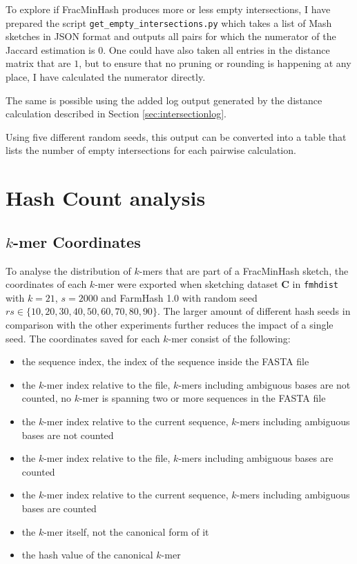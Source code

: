 To explore if FracMinHash produces more or less empty intersections, I have
prepared the script \texttt{get\_empty\_intersections.py} which takes a list of
Mash sketches in JSON format and outputs all pairs for which the numerator of
the Jaccard estimation is $0$. One could have also taken all entries in the
distance matrix that are $1$, but to ensure that no pruning or rounding is
happening at any place, I have calculated the numerator directly.

The same is possible using the added log output generated by the distance
calculation described in Section \ref{sec:intersectionlog}.

Using five different random seeds, this output can be converted into a table
that lists the number of empty intersections for each pairwise calculation.


\section{Hash Count analysis}
\subsection*{$k$-mer Coordinates}
To analyse the distribution of $k$-mers that are part of a FracMinHash sketch,
the coordinates of each $k$-mer were exported when sketching dataset \textbf{C}
in \texttt{fmhdist} with $k=21$, $s=2000$ and FarmHash 1.0 with random seed $rs
\in \{10, 20, 30, 40, 50, 60, 70, 80, 90\}$. The larger amount of different hash
seeds in comparison with the other experiments further reduces the impact of a
single seed. The coordinates saved for each $k$-mer consist of the following:

\begin{itemize}
  \item the sequence index, the index of the sequence inside the FASTA file
  \item the $k$-mer index relative to the file, $k$-mers including
  ambiguous bases are not counted, no $k$-mer is spanning two or more sequences
  in the FASTA file
  \item the $k$-mer index relative to the current sequence, $k$-mers including
  ambiguous bases are not counted
  \item the $k$-mer index relative to the file, $k$-mers including ambiguous
  bases are counted
  \item the $k$-mer index relative to the current sequence, $k$-mers including
  ambiguous bases are counted
  \item the $k$-mer itself, not the canonical form of it
  \item the hash value of the canonical $k$-mer
\end{itemize}

